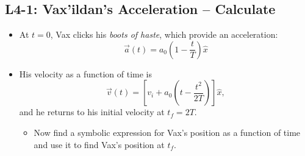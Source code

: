 \documentclass[]{article}
\begin{document}
\begin{PresentSpace}
\vspace{-10pt}
\section*{L4-1: Vax'ildan's Acceleration -- Calculate}
\vspace{-10pt}
\begin{itemize}
	\item At $t=0$, Vax clicks his \textit{boots of haste}, which provide an acceleration:
	\[
	\vec{a}(t) = a_{0}\left(1-\frac{t}{T}\right)\hat{x}
	\]
	\item His velocity as a function of time is
	\[
	\vec{v}(t) = \left[v_{i}+a_{0}\left(t-\frac{t^{2}}{2T}\right)\right]\hat{x},
	\]
	and he returns to his initial velocity at $t_{f}=2T$.
	\begin{itemize}
		\item Now find a symbolic expression for Vax's position as a function of time and use it to find Vax's position at $t_{f}$.
	\end{itemize}
\end{itemize}
\end{PresentSpace}
\newpage
\end{document}
